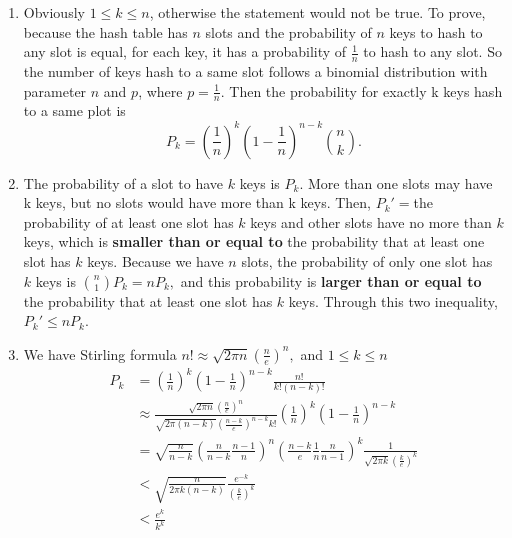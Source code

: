 \documentclass{assignment}
\begin{document}
    \maketitle

    \newpage

    \begin{homeworkProblem}
	\begin{enumerate}
	\item
	Obviously $1 \leq k \leq n$, otherwise the statement would not be true. To prove, because the hash table has $n$ slots and the probability of $n$ keys to hash to any slot is equal, for each key, it has a probability of $\frac{1}{n}$ to hash to any slot. So the number of keys hash to a same slot follows a binomial distribution with parameter $n$ and $p$, where $p=\frac{1}{n}$. Then the probability for exactly k keys hash to a same plot is $$P_k = \left(\frac{1}{n}\right)^k \left(1-\frac{1}{n}\right)^{n-k} \binom n k.$$
	\item The probability of a slot to have $k$ keys is $P_k$. More than one slots may have k keys, but no slots would have more than k keys. Then, $P_k' = $the probability of at least one slot has $k$ keys and other slots have no more than $k$ keys, which is \textbf{smaller than or equal to} the probability that at least one slot has $k$ keys. Because we have $n$ slots, the probability of only one slot has $k$ keys is $\binom n 1 P_k = nP_k,$ and this probability is \textbf{larger than or equal to} the probability that at least one slot has $k$ keys. Through this two inequality, $P_k' \leq nP_k$.
	\item We have Stirling formula $n! \approx \sqrt{2\pi n}\left(\frac{n}{e}\right)^n,$ and $1 \leq k\leq n$
		\begin{equation*}
	\begin{aligned}
	P_k &= \left(\frac{1}{n}\right)^k \left(1-\frac{1}{n}\right)^{n-k} \frac{n!}{k!(n-k)!} \\
	&\approx \frac{\sqrt{2 \pi n}\left(\frac{n}{e}\right)^n}{\sqrt{2 \pi (n-k)}\left(\frac{n-k}{e}\right)^{n-k}k!} \left(\frac{1}{n}\right)^k \left(1-\frac{1}{n}\right)^{n-k} \\
	&=\sqrt{ \frac{n}{n-k}} \left(\frac{n}{n-k} \frac{n-1}{n}\right)^n \left(\frac{n-k}{e} \frac{1}{n}\frac{n}{n-1}\right)^{k} \frac{1}{\sqrt{2 \pi k}\left(\frac{k}{e}\right)^k} \\
	& < \sqrt{ \frac{n}{2 \pi k(n-k)}}   \frac{e^{-k}}{\left(\frac{k}{e}\right)^k} \\
	&< \frac{e^k}{k^k}
	\end{aligned}
	\end{equation*}
	
	
	
	\end{enumerate}
    	
    \end{homeworkProblem}
    
\end{document}
